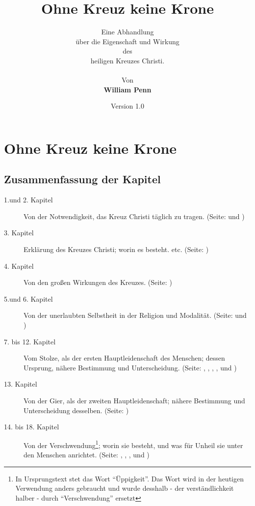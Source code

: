 \documentclass[a5paper,pagesize,10pt]{scrbook}
\begin{document}
\author{
Eine Abhandlung \\
über die Eigenschaft und Wirkung
\\
des
\\
heiligen Kreuzes Christi.
\\
\\
Von
\\
\textbf{William Penn}
}

\title{Ohne Kreuz keine Krone}
\date{Version 1.0}

\maketitle

\frontmatter

\tableofcontents




\mainmatter
\part{Ohne Kreuz keine Krone}



\chapter{Zusammenfassung der Kapitel}
\begin{description}
\item[1.und 2. Kapitel] Von der Notwendigkeit, das Kreuz Christi täglich zu
tragen. (Seite: \pageref{kap1} und  \pageref{kap2})
\item[3. Kapitel] Erklärung des Kreuzes Christi; worin es besteht. etc. (Seite:
\pageref{kap3})
\item[4. Kapitel] Von den großen Wirkungen des Kreuzes. (Seite: \pageref{kap4})
\item[5.und 6. Kapitel] Von der unerlaubten Selbstheit in der Religion und
Modalität. (Seite: \pageref{kap5} und \pageref{kap6})
\item[7. bis 12. Kapitel] Vom Stolze, als der ersten Hauptleidenschaft des
Menschen; dessen Ursprung, nähere Bestimmung und Unterscheidung. (Seite:
\pageref{kap7}, \pageref{kap8}, \pageref{kap9}, \pageref{kap10}, \pageref{kap11}
und \pageref{kap12})
\item[13. Kapitel] Von der Gier, als der zweiten Hauptleidenschaft; nähere
Bestimmung und Unterscheidung desselben. (Seite: \pageref{kap13})
\item[14. bis 18. Kapitel] Von der Verschwendung\footnote{In Ursprungstext stet
das Wort "`Üppigkeit"'. Das Wort wird in der heutigen Verwendung anders
gebraucht und wurde desshalb - der verständlichkeit halber - durch
"`Verschwendung"' ersetzt}; worin sie besteht, und was für Unheil sie unter den
Menschen anrichtet. (Seite: \pageref{kap14}, \pageref{kap15} , \pageref{kap16} ,
\pageref{kap17} und \pageref{kap18})
\end{description}
\end{document}
